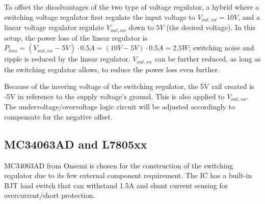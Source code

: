 \documentclass[main.tex]{subfiles}
\begin{document}
    \justify
    To offset the disadvantages of the two type of voltage regulator, a hybrid where a switching voltage regulator first regulate the input voltage to $V_{out,sw}=10V$, and a linear voltage regulator regulate $V_{out,sw}$ down to $5V$ (the desired voltage). In this setup, the power loss of the linear regulator is $P_{loss} = (V_{out,sw} - 5V) \cdot 0.5A = (10V - 5V) \cdot 0.5A = 2.5W$; switching noise and ripple is reduced by the linear regulator. $V_{out,sw}$ can be further reduced, as long as the switching regulator allows, to reduce the power loss even further.

    \justify
    Because of the invering voltage of the switching regulator, the 5V rail created is -5V in reference to the supply voltage's ground. This is also applied to $V_{out,sw}$. The undervoltage/overvoltage logic circuit will be adjusted accordingly to compensate for the negative offset.

    \subsection{MC34063AD and L7805xx}

    \justify
    MC34063AD from Onsemi \cite{MC34063AD} is chosen for the construction of the switching regulator due to its few external component requirement. The IC has a built-in BJT load switch that can withstand 1.5A and shunt current sensing for overcurrent/short protection.
\end{document}
